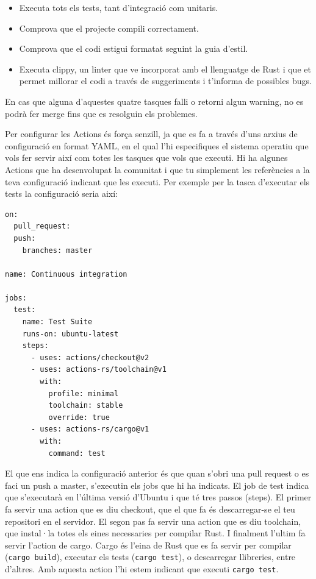 ﻿\documentclass{article}
\begin{document}
\begin{itemize}
    \item Executa tots els tests, tant d'integració com unitaris.
    \item Comprova que el projecte compili correctament.
    \item Comprova que el codi estigui formatat seguint la guia d'estil.
    \item Executa clippy, un linter que ve incorporat amb el llenguatge de Rust 
        i que et permet millorar el codi a través de suggeriments i t'informa de
        possibles bugs.
\end{itemize}

En cas que alguna d'aquestes quatre tasques falli o retorni algun warning, 
no es podrà fer merge fins que es resolguin els problemes.

Per configurar les Actions és força senzill, ja que es fa a través d'uns arxius
de configuració en format YAML, en el qual l'hi especifiques el sistema operatiu
que vols fer servir així com totes les tasques que vols que executi. Hi ha 
algunes Actions que ha desenvolupat la comunitat i que tu simplement les 
referències a la teva configuració indicant que les executi. Per exemple per la
tasca d'executar els tests la configuració seria així:

\begin{verbatim}
on:
  pull_request:
  push:
    branches: master

name: Continuous integration

jobs:
  test:
    name: Test Suite
    runs-on: ubuntu-latest
    steps:
      - uses: actions/checkout@v2
      - uses: actions-rs/toolchain@v1
        with:
          profile: minimal
          toolchain: stable
          override: true
      - uses: actions-rs/cargo@v1
        with:
          command: test
\end{verbatim}

El que ens indica la configuració anterior és que quan s'obri una pull request o
es faci un push a master, s'executin els jobs que hi ha indicats. El job de test
indica que s'executarà en l'última versió d'Ubuntu i que té tres passos (steps).
El primer fa servir una action que es diu checkout, que el que fa és
descarregar-se el teu repositori en el servidor. El segon pas fa servir una
action que es diu toolchain, que instal·la totes els eines necessaries per
compilar Rust. I finalment l'ultim fa servir l'action de cargo. Cargo és l'eina
de Rust que es fa servir per compilar (\texttt{cargo build}), executar els tests
(\texttt{cargo test}), o descarregar llibreries, entre d'altres. Amb aquesta
action l'hi estem indicant que executi \texttt{cargo test}.
\end{document}
